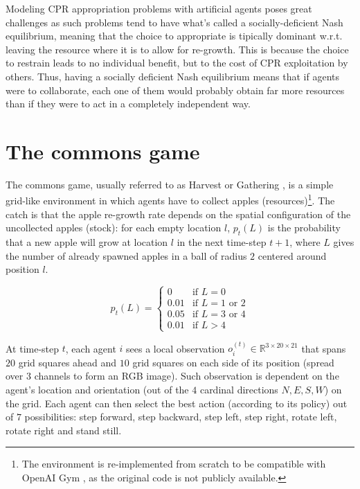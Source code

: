 \documentclass{article}
\begin{document}
Modeling CPR appropriation problems with artificial agents poses great challenges as such problems tend to have what's called a socially-deficient Nash equilibrium, meaning that the choice to appropriate is tipically dominant w.r.t. leaving the resource where it is to allow for re-growth. This is because the choice to restrain leads to no individual benefit, but to the cost of CPR exploitation by others. Thus, having a socially deficient Nash equilibrium means that if agents were to collaborate, each one of them would probably obtain far more resources than if they were to act in a completely independent way.

\section{The commons game}
The commons game, usually referred to as Harvest \cite{harvest} or Gathering \cite{sequential-social-dilemmas}, is a simple grid-like environment in which agents have to collect apples (resources)\footnote{The environment is re-implemented from scratch to be compatible with OpenAI Gym \cite{gym}, as the original code is not publicly available.}. The catch is that the apple re-growth rate depends on the spatial configuration of the uncollected apples (stock): for each empty location $l$, $p_t(L)$ is the probability that a new apple will grow at location $l$ in the next time-step $t+1$, where $L$ gives the number of already spawned apples in a ball of radius $2$ centered around position $l$.

\[
  p_t(L)= 
  \begin{cases} 
    0 & \text{if } L = 0 \\
    0.01 & \text{if } L = 1 \text{ or } 2 \\
    0.05 & \text{if } L = 3 \text{ or } 4 \\
    0.01 & \text{if } L > 4 
  \end{cases}
\]

At time-step $t$, each agent $i$ sees a local observation $o_i^{(t)}\in\mathbb{R}^{3\times20\times21}$ that spans $20$ grid squares ahead and $10$ grid squares on each side of its position (spread over $3$ channels to form an RGB image). Such observation is dependent on the agent's location and orientation (out of the $4$ cardinal directions $N, E, S, W$) on the grid. Each agent can then select the best action (according to its policy) out of $7$ possibilities: step forward, step backward, step left, step right, rotate left, rotate right and stand still. 
\end{document}
